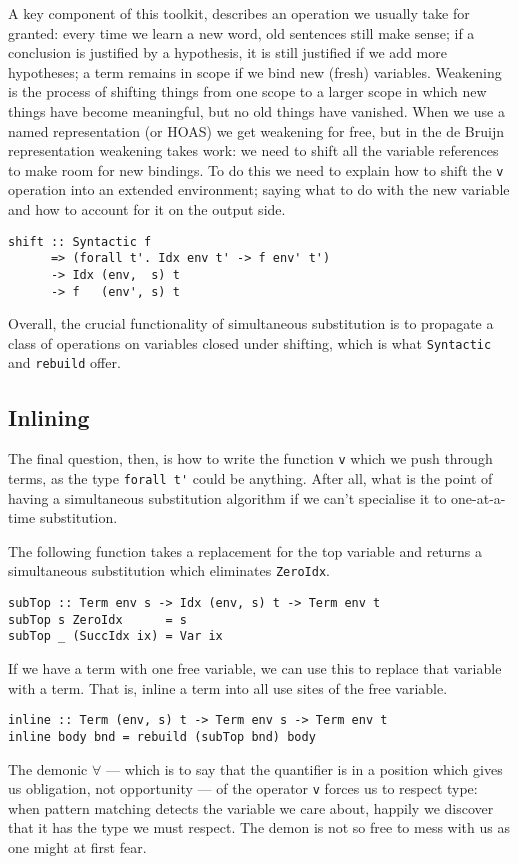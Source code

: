 A key component of this toolkit,  describes an operation we
usually take for granted: every time we learn a new word, old sentences still
make sense; if a conclusion is justified by a hypothesis, it is still justified
if we add more hypotheses; a term remains in scope if we bind new (fresh)
variables. Weakening is the process of shifting things from one scope to a
larger scope in which new things have become meaningful, but no old things have
vanished. When we use a named representation (or HOAS) we get weakening
for free, but in the de Bruijn representation weakening takes
work: we need to shift all the variable references to make room for new
bindings. To do this we need to explain how to shift the \texttt{v} operation
into an extended environment; saying what to do with the new variable and how to
account for it on the output side.
%
\begin{lstlisting}[style=haskell]
shift :: Syntactic f
      => (forall t'. Idx env t' -> f env' t')
      -> Idx (env,  s) t
      -> f   (env', s) t
\end{lstlisting}
%
Overall, the crucial functionality of simultaneous substitution is to propagate
a class of operations on variables closed under shifting, which is what
\texttt{Syntactic} and \texttt{rebuild} offer.


\subsection{Inlining}

The final question, then, is how to write the function \texttt{v} which we push
through terms, as the type \lstinline[style=inline]{forall t'} could be anything. After all,
what is the point of having a simultaneous substitution algorithm if we can't
specialise it to one-at-a-time substitution.

The following function takes a replacement for the top variable and returns a
simultaneous substitution which eliminates \texttt{ZeroIdx}.
%
\begin{lstlisting}[style=haskell]
subTop :: Term env s -> Idx (env, s) t -> Term env t
subTop s ZeroIdx      = s
subTop _ (SuccIdx ix) = Var ix
\end{lstlisting}
%
If we have a term with one free variable, we can use this to replace that
variable with a term. That is, inline a term into all use sites of the free
variable.
%
\begin{lstlisting}[style=haskell,firstnumber=last,caption={A simultaneous substitution to inline terms}]
inline :: Term (env, s) t -> Term env s -> Term env t
inline body bnd = rebuild (subTop bnd) body
\end{lstlisting}
%
The demonic $\forall$ --- which is to say that the quantifier is in a position
which gives us obligation, not opportunity --- of the operator \texttt{v} forces
us to respect type: when pattern matching detects the variable we care about,
happily we discover that it has the type we must respect. The demon is not so
free to mess with us as one might at first fear.

